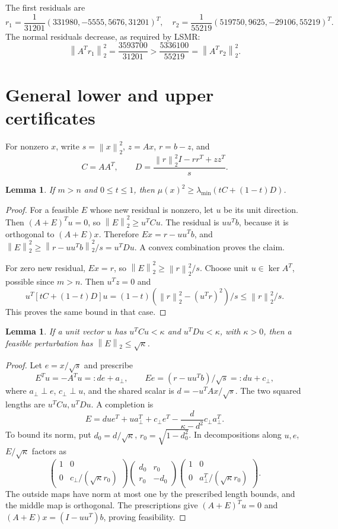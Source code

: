 \documentclass[11pt]{article}
\newtheorem{lemma}[theorem]{Lemma}
\newcommand{\norm}[1]{\left\lVert#1\right\rVert}
\begin{document}
The first residuals are
\[
r_1=\frac1{31201}(331980,-5555,5676,31201)^T,\quad
r_2=\frac1{55219}(519750,9625,-29106,55219)^T.
\]
The normal residuals decrease, as required by LSMR:
\[
\norm{A^Tr_1}_2^2=\frac{3593700}{31201}>\frac{5336100}{55219}=\norm{A^Tr_2}_2^2.
\]
\section{General lower and upper certificates}
For nonzero $x$, write $s=\norm x_2^2$, $z=Ax$, $r=b-z$, and
\[C=AA^T,\qquad D=\frac{\norm r_2^2I-rr^T+zz^T}{s}.\]
\begin{lemma}
If $m>n$ and $0\le t\le1$, then $\mu(x)^2\ge\lambda_{\min}(tC+(1-t)D)$.
\end{lemma}
\begin{proof}
For a feasible $E$ whose new residual is nonzero, let $u$ be its unit direction. Then $(A+E)^Tu=0$, so $\norm E_2^2\ge u^TCu$. The residual is $uu^Tb$, because it is orthogonal to $(A+E)x$. Therefore $Ex=r-uu^Tb$, and $\norm E_2^2\ge\norm{r-uu^Tb}_2^2/s=u^TDu$. A convex combination proves the claim.

For zero new residual, $Ex=r$, so $\norm E_2^2\ge\norm r_2^2/s$. Choose unit $u\in\ker A^T$, possible since $m>n$. Then $u^Tz=0$ and
\[
u^T[tC+(1-t)D]u=(1-t)(\norm r_2^2-(u^Tr)^2)/s\le\norm r_2^2/s.
\]
This proves the same bound in that case.
\end{proof}
\begin{lemma}
If a unit vector $u$ has $u^TCu<\kappa$ and $u^TDu<\kappa$, with $\kappa>0$, then a feasible perturbation has $\norm E_2\le\sqrt\kappa$.
\end{lemma}
\begin{proof}
Let $e=x/\sqrt s$ and prescribe
\[
E^Tu=-A^Tu=:de+a_\perp,\qquad
Ee=(r-uu^Tb)/\sqrt s=:du+c_\perp,
\]
where $a_\perp\perp e$, $c_\perp\perp u$, and the shared scalar is $d=-u^TAx/\sqrt s$. The two squared lengths are $u^TCu,u^TDu$. A completion is
\[
E=due^T+ua_\perp^T+c_\perp e^T-\frac{d}{\kappa-d^2}c_\perp a_\perp^T.
\]
To bound its norm, put $d_0=d/\sqrt\kappa$, $r_0=\sqrt{1-d_0^2}$. In decompositions along $u,e$, $E/\sqrt\kappa$ factors as
\[
\begin{pmatrix}1&0\\0&c_\perp/(\sqrt\kappa r_0)\end{pmatrix}
\begin{pmatrix}d_0&r_0\\r_0&-d_0\end{pmatrix}
\begin{pmatrix}1&0\\0&a_\perp^T/(\sqrt\kappa r_0)\end{pmatrix}.
\]
The outside maps have norm at most one by the prescribed length bounds, and the middle map is orthogonal. The prescriptions give $(A+E)^Tu=0$ and $(A+E)x=(I-uu^T)b$, proving feasibility.
\end{proof}
\end{document}
